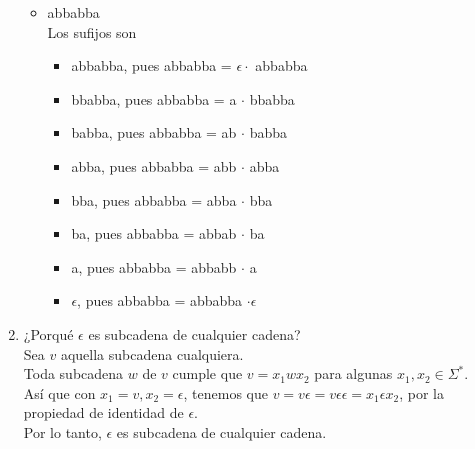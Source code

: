 \documentclass{article}
\begin{document}
\begin{enumerate}
{\begin{itemize}
            \item {
                abbabba \\
                Los sufijos son
                \begin{itemize}
                    \item {
                        abbabba, pues abbabba = $\epsilon \cdot$ abbabba
                    }
                    \item {
                        bbabba, pues abbabba = a $\cdot$ bbabba
                    }
                    \item {
                        babba, pues abbabba = ab $\cdot$ babba
                    }
                    \item {
                        abba, pues abbabba = abb $\cdot$ abba
                    }
                    \item {
                        bba, pues abbabba = abba $\cdot$ bba 
                    }
                    \item {
                        ba, pues abbabba = abbab $\cdot$ ba
                    }
                    \item {
                        a, pues abbabba = abbabb $\cdot$ a 
                    }
                    \item {
                        $\epsilon$, pues abbabba = abbabba $\cdot \epsilon$
                    }
                \end{itemize}
            }
        \end{itemize}
    }

    \item {
        ¿Porqué $\epsilon$ es subcadena de cualquier cadena?\\
        Sea $v$ aquella subcadena cualquiera. \\
        Toda subcadena $w$ de $v$ cumple que $v = x_1wx_2$ para algunas 
        $x_1, x_2 \in \Sigma^*$. \\
        Así que con $x_1 = v, x_2 = \epsilon$, tenemos que 
        $v = v \epsilon = v \epsilon \epsilon = x_1 \epsilon x_2$, por la propiedad de identidad de $\epsilon$.\\
        Por lo tanto, $\epsilon$ es subcadena de cualquier cadena.
    }

\end{enumerate}
    
\end{document}
